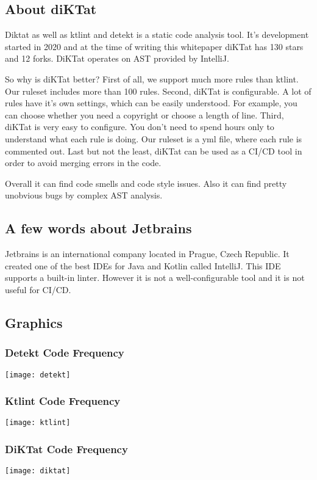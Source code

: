 \subsection{About diKTat}
\par Diktat as well as ktlint and detekt is a static code analysis tool. It's development started in 2020 and at the time of writing this whitepaper diKTat has 130 stars and 12 forks. DiKTat operates on AST provided by IntelliJ. 
\par So why is diKTat better? First of all, we support much more rules than ktlint. Our ruleset includes more than 100 rules. Second, diKTat is configurable. A lot of rules have it's own settings, which can be easily understood. For example, you can choose whether you need a copyright or choose a length of line. Third, diKTat is very easy to configure. You don't need to spend hours only to understand what each rule is doing. Our ruleset is a yml file, where each rule is commented out. Last but not the least, diKTat can be used as a CI/CD tool in order to avoid merging errors in the code.
\par Overall it can find code smells and code style issues. Also it can find pretty unobvious bugs by complex AST analysis.

\subsection{A few words about Jetbrains}
\par Jetbrains is an international company located in Prague, Czech Republic. It created one of the best IDEs for Java and Kotlin called IntelliJ. This IDE supports a built-in linter. However it is not a well-configurable tool and it is not useful for CI/CD.

\subsection{Graphics}
\subsubsection{Detekt Code Frequency}
\texttt{[image: detekt]}
\subsubsection{Ktlint Code Frequency}
\texttt{[image: ktlint]}
\subsubsection{DiKTat Code Frequency}
\texttt{[image: diktat]}
